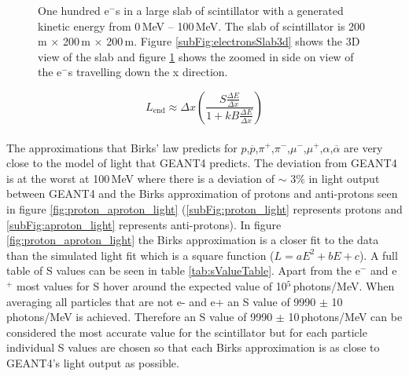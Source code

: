\begin{figure}[!h]
\begin{subfigure}{.5\textwidth}
  \captionsetup{width=.9\linewidth}
  \caption{}
  \label{subFig:electronsSlabSideOn}
\end{subfigure}
\caption{One hundred e$^-$s in a large slab of scintillator with a generated kinetic energy from 0\,MeV -- 100\,MeV. The slab of scintillator is 200\,m $\times$ 200\,m $\times$ 200\,m. Figure \ref{subFig:electronsSlab3d} shows the 3D view of the slab and figure \ref{subFig:electronsSlabSideOn} shows the zoomed in side on view of the e$^-$s travelling down the x direction.}
\label{fig:electrons_viewed_in_slab}
\end{figure}

\begin{equation}
L_{\textrm{end}}\approx \Delta x \left(\frac{S\frac{\Delta E}{\Delta x}}{1 + kB \frac{\Delta E}{\Delta x}}\right) 
\label{equ:light_produced}
\end{equation}
\\The approximations that Birks' law predicts for $p$,$\overline{p}$,$\pi^+$,$\pi^-$,$\mu^-$,$\mu^+$,$\alpha$,$\overline{\alpha}$ are very close to the model of light that GEANT4 predicts. The deviation from GEANT4 is at the worst at 100\,MeV where there is a deviation of $\sim$ $3\%$ in light output between GEANT4 and the Birks approximation of protons and anti-protons seen in figure \ref{fig:proton_aproton_light} (\ref{subFig:proton_light} represents protons and \ref{subFig:aproton_light} represents anti-protons). In figure \ref{fig:proton_aproton_light} the Birks approximation is a closer fit to the data than the simulated light fit which is a square function ($L = aE^2 + bE+ c$). A full table of S values can be seen in table \ref{tab:sValueTable}. Apart from the e$^-$ and e$^+$ most values for S hover around the expected value of 10$^5$\,photons/MeV. When averaging all particles that are not e- and e+ an S value of 9990 $\pm$ 10\,photons/MeV is achieved. Therefore an S value of 9990 $\pm$ 10\,photons/MeV can be considered the most accurate value for the scintillator but for each particle individual S values are chosen so that each Birks approximation is as close to GEANT4's light output as possible.


